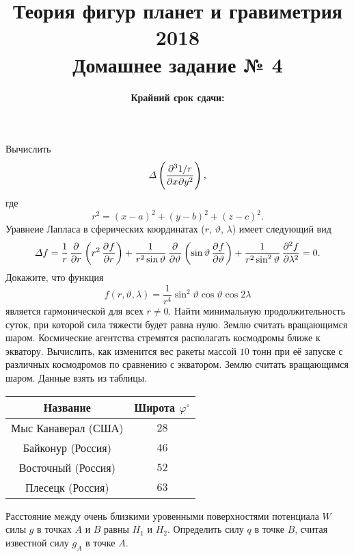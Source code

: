 \documentclass[11pt, a4paper,addpoints]{exam}
\title{{\Large Теория фигур планет и гравиметрия 2018}\\ 
    {\bf\Large Домашнее задание № 4}}
\author{}
\date{\normalsize\bf Крайний срок сдачи: \DTMusedate{deadline}}
\theoremstyle{remark}
\renewcommand{\phi}{\ensuremath{\varphi}}
\renewcommand{\theta}{\vartheta}
\begin{document}
\maketitle
\thispagestyle{empty}
\begin{questions}
        \question[1] Вычислить
        \begin{equation*}
            \Delta\left( \dmd{1/r}{3}{x}{}{y}{2} \right),
        \end{equation*}
        где
        \begin{equation*}
            r^2 = \left( x - a \right)^2 + \left( y - b \right)^2 + \left( z - c \right)^2.
        \end{equation*}
        \question[1] Уравнеие Лапласа в сферических координатах ($r$, $\theta$, $\lambda$) имеет
        следующий вид
        \begin{equation*}
            \Delta f = \dfrac{1}{r}\dpd{}{r}\left( r^2 \dpd{f}{r} \right) +
            \dfrac{1}{r^2\sin\theta}\dpd{}{\theta}\left( \sin\theta \dpd{f}{\theta} \right) +
            \dfrac{1}{r^2\sin^2\theta}\dpd[2]{f}{\lambda} = 0.
        \end{equation*}
        Докажите, что функция 
        \begin{equation*}
            f\left( r, \theta, \lambda \right) = \dfrac{1}{r^4}\sin^2\theta \cos\theta\cos{2\lambda}
        \end{equation*}
        является гармонической для всех $r\neq 0$.
        \question[1] Найти минимальную продолжительность суток, при которой сила тяжести будет равна
        нулю. Землю считать вращающимся шаром.
        \question[1] Космические агентства стремятся располагать космодромы ближе к экватору.
        Вычислить, как изменится вес ракеты массой $10$ тонн при её запуске с различных космодромов
        по сравнению с экватором. Землю считать вращающимся шаром. Данные взять из таблицы.
        \begin{table}[h]
            \centering
            \begin{tabular}{|c|c|}
                \hline
                Название & Широта $\phi ^\circ$ \\ \hline
                Мыс Канаверал (США) & $28$ \\ \hline
                Байконур (Россия) & $46$ \\ \hline
                Восточный (Россия) & $52$ \\ \hline
                Плесецк (Россия) & $63$ \\\hline
            \end{tabular}
        \end{table}
        \question[1] Расстояние между очень близкими уровенными поверхностями потенциала $W$ силы
        $g$ в точках $A$ и $B$ равны $H_1$ и $H_2$. Определить силу $q$ в точке $B$, считая
        известной силу $g_A$ в точке $A$.
    \end{questions}
\end{document}
